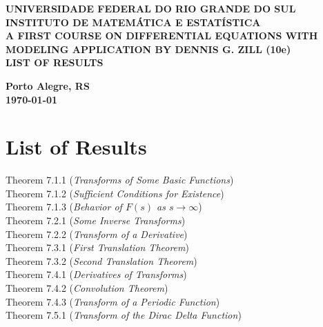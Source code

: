 \documentclass[12pt]{article}
\begin{document}
\begin{center}
    \textbf{\large UNIVERSIDADE FEDERAL DO RIO GRANDE DO SUL} \\
    \textbf{\large INSTITUTO DE MATEMÁTICA E ESTATÍSTICA} \\
    \vspace{3cm}
    \textbf{\Large A FIRST COURSE ON DIFFERENTIAL EQUATIONS WITH MODELING APPLICATION BY DENNIS G. ZILL (10e)} \\
    \vspace{1cm}
    \textbf{\large LIST OF RESULTS} \\
    \vspace{3cm}
    
    \author{Leonardo Suarez}
    
    \vfill
    \textbf{\large Porto Alegre, RS} \\
    \textbf{\large\today} \\
\end{center}\newpage

\section*{List of Results}

\noindent Theorem 7.1.1 (\emph{Transforms of Some Basic Functions})  \\
Theorem 7.1.2 (\emph{Sufficient Conditions for Existence})  \\
Theorem 7.1.3 (\emph{Behavior of \(F(s)\) as \(s \to \infty\)})  \\
Theorem 7.2.1 (\emph{Some Inverse Transforms})  \\
Theorem 7.2.2 (\emph{Transform of a Derivative})  \\
Theorem 7.3.1 (\emph{First Translation Theorem})  \\
Theorem 7.3.2 (\emph{Second Translation Theorem})  \\
Theorem 7.4.1 (\emph{Derivatives of Transforms})  \\
Theorem 7.4.2 (\emph{Convolution Theorem})  \\
Theorem 7.4.3 (\emph{Transform of a Periodic Function})  \\
Theorem 7.5.1 (\emph{Transform of the Dirac Delta Function})  \\

\vspace{0.5em}
\end{document}
